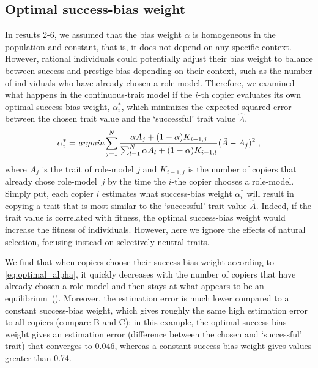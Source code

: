 \documentclass[12pt]{extarticle}
\begin{document}
\subsection*{Optimal success-bias weight}
In results 2-6, we assumed that the bias weight $\alpha$ is homogeneous in the population and constant, that is, it does not depend on any specific context.
However, rational individuals could potentially adjust their bias weight to balance between success and prestige bias depending on their context, such as the number of individuals who have already chosen a role model.
Therefore, we examined what happens in the continuous-trait model if the $i$-th copier evaluates its own optimal success-bias weight, $\alpha^*_i$, which minimizes the expected squared error between the chosen trait value and the `successful' trait value $\hat{A}$,
\begin{equation}\label{eq:optimal_alpha}
\alpha^*_i = \emph{argmin} \sum_{j=1}^N\frac{\alpha A_j + (1-\alpha) K_{i-1,j}}{\sum_{l=1}^N\alpha A_l + (1-\alpha) K_{i-1,l}} (\hat{A}-A_j)^2 \;,
\end{equation}
where $A_j$ is the trait of role-model $j$ and $K_{i-1,j}$ is the number of copiers that already chose role-model~$j$ by the time the $i$-the copier chooses a role-model.
Simply put, each copier $i$ estimates what success-bias weight $\alpha^*_i$ will result in copying a trait that is most similar to the `successful' trait value $\hat{A}$.
Indeed, if the trait value is correlated with fitness, the optimal success-bias weight would increase the fitness of individuals. However, here we ignore the effects of natural selection, focusing instead on selectively neutral traits.

We find that when copiers choose their success-bias weight according to \cref{eq:optimal_alpha}, it quickly decreases with the number of copiers that have already chosen a role-model and then stays at what appears to be an equilibrium~().
Moreover, the estimation error is much lower compared to a constant success-bias weight, which gives roughly the same high estimation error to all copiers (compare B and C): in this example, the optimal success-bias weight gives an estimation error (difference between the chosen and `successful' trait) that converges to $0.046$, whereas a constant success-bias weight gives values greater than 0.74.
\end{document}
